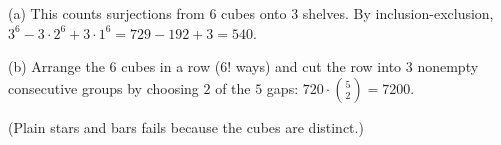(a) This counts surjections from $6$ cubes onto $3$ shelves. By inclusion-exclusion, $3^6-3\cdot2^6+3\cdot1^6=729-192+3=\boxed{540}$.

(b) Arrange the $6$ cubes in a row ($6!$ ways) and cut the row into $3$ nonempty consecutive groups by choosing $2$ of the $5$ gaps: $720\cdot\binom52=\boxed{7200}$.

(Plain stars and bars fails because the cubes are distinct.)

